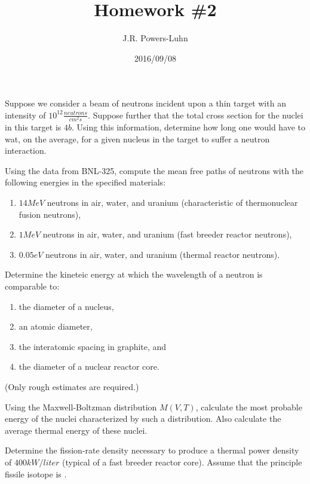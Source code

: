 \documentclass{hw}
\author{J.R. Powers-Luhn}
\date{2016/09/08}
\title{Homework \#2}
\begin{document}
	Suppose we consider a beam of neutrons incident upon a thin target with an intensity of $ 10^{12} \frac{neutrons}{cm^2 s} $. Suppose further that the total cross section for the nuclei in this target is $ 4 b $. Using this information, determine how long one would have to wat, on the average, for a given nucleus in the target to suffer a neutron interaction.

\solution


	Using the data from BNL-325, compute the mean free paths of neutrons with the following energies in the specified materials:
	\begin{enumerate}
		\item $ 14 MeV $ neutrons in air, water, and uranium (characteristic of thermonuclear fusion neutrons),
		\item $ 1 MeV $ neutrons in air, water, and uranium (fast breeder reactor neutrons),
		\item $ 0.05 eV $ neutrons in air, water, and uranium (thermal reactor neutrons).
	\end{enumerate}

\solution


	Determine the kineteic energy at which the wavelength of a neutron is comparable to:
	\begin{enumerate}
		\item the diameter of a nucleus,
		\item an atomic diameter,
		\item the interatomic spacing in graphite, and
		\item the diameter of a nuclear reactor core.
	\end{enumerate}
	(Only rough estimates are required.)

\solution


	Using the Maxwell-Boltzman distribution $ M(V,T) $, calculate the most probable energy of the nuclei characterized by such a distribution. Also calculate the average thermal energy of these nuclei.

\solution


	Determine the fission-rate density necessary to produce a thermal power density of $ 400 kW/liter $ (typical of a fast breeder reactor core). Assume that the principle fissile isotope is .

\solution
\end{document}
